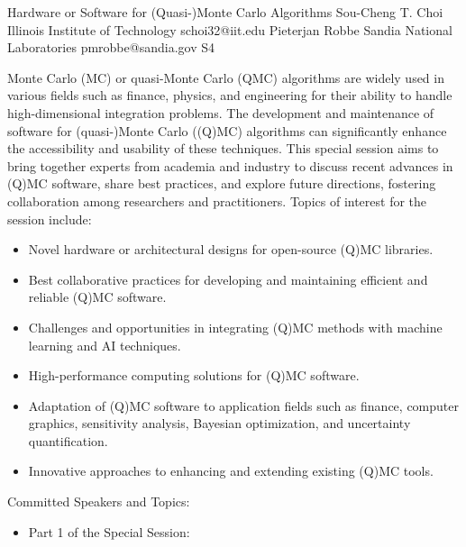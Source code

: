 \begin{session}
 {Hardware or Software for (Quasi-)Monte Carlo Algorithms}%
 {Sou-Cheng T.  Choi}%
 {Illinois Institute of Technology}%
 {schoi32@iit.edu}%
 {Pieterjan Robbe}%
 {Sandia National Laboratories}%
 {pmrobbe@sandia.gov}%
 {S4}%
 {}%

 Monte Carlo (MC) or quasi-Monte Carlo (QMC) algorithms are widely used in various fields such as finance, physics, and engineering for their ability to handle high-dimensional integration problems. The development and maintenance of software for (quasi-)Monte Carlo ((Q)MC) algorithms can significantly enhance the accessibility and usability of these techniques. This special session aims to bring together experts from academia and industry to discuss recent advances in (Q)MC software, share best practices, and explore future directions, fostering collaboration among researchers and practitioners.
 Topics of interest for the session include:
 \begin{itemize}
 \item Novel hardware or architectural designs for open-source (Q)MC libraries.
 \item Best collaborative practices for developing and maintaining efficient and reliable (Q)MC software.
 \item Challenges and opportunities in integrating (Q)MC methods with machine learning and AI techniques.
 \item High-performance computing solutions for (Q)MC software.
 \item Adaptation of (Q)MC software to application fields such as finance, computer graphics, sensitivity analysis, Bayesian optimization, and uncertainty quantification.
 \item Innovative approaches to enhancing and extending existing (Q)MC tools.
 \end{itemize}
 Committed Speakers and Topics:
 \begin{itemize}
 \item Part 1 of the Special Session:

\end{itemize}
\end{session}
